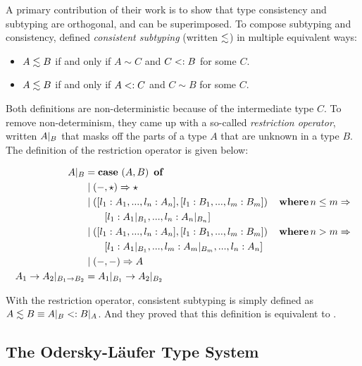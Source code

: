A primary contribution of their work is to show that type consistency and
subtyping are orthogonal, and can be superimposed. To compose subtyping and
consistency, \citeauthor{siek2007gradual} defined \textit{consistent subtyping}
(written $\lesssim$) in multiple equivalent ways:

\begin{mdef}\leavevmode
\label{def:old-decl-conssub}
\begin{itemize}
\item $A \lesssim B$ if and only if $A \sim C$ and $C <: B$ for some $C$.
\item $A \lesssim B$ if and only if $A <: C$ and $C \sim B$ for some $C$.
\end{itemize}
\end{mdef}

Both definitions are non-deterministic because of the intermediate type $C$. To
remove non-determinism, they came up with a so-called \textit{restriction
  operator}, written ${A}|_{B}$ that masks off the parts of a type $A$ that are
unknown in a type $B$. The definition of the restriction operator is given
below:
\begin{small}
\begin{align*}
  {A}|_{B} & =  \operatorname{\mathbf{case}}~(A, B)~\operatorname{\mathbf{of}}\\
               & \mid (-, \star) \Rightarrow \star\\
               & \mid ([l_1: A_1,...,l_n:A_n], [l_1:B_1,...,l_m:B_m]) \quad \operatorname{\mathbf{where}} n \leq m \Rightarrow\\
               & \qquad [l_1 : {A_1}|_{B_1}, ..., l_n : {A_n}|_{B_n}]\\
               & \mid ([l_1: A_1,...,l_n:A_n], [l_1:B_1,...,l_m:B_m]) \quad \operatorname{\mathbf{where}} n > m \Rightarrow\\
               & \qquad [l_1 : {A_1}|_{B_1}, ..., l_m : {A_m}|_{B_m},...,l_n:A_n ]\\
               & \mid (-, -) \Rightarrow A\\
  {A_1 \to A_2}|_{B_1 \to B_2} & =  {A_1}|_{B_1} \to {A_2}|_{B_2}
\end{align*}
\end{small}
With the restriction operator, consistent subtyping is simply defined
as $A \lesssim B \equiv {A}|_{B} <: {B}|_{A}$. And they proved that this
definition is equivalent to .


\subsection{The Odersky-L{\"a}ufer Type System}

